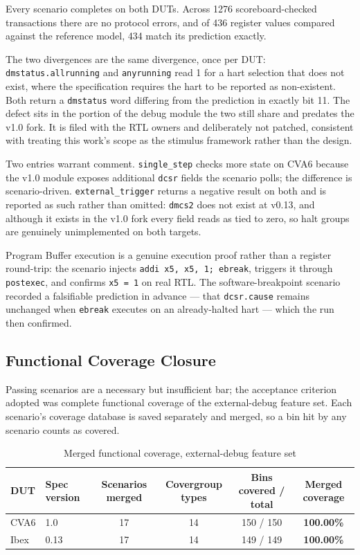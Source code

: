 \documentclass[conference]{IEEEtran}
\begin{document}
Every scenario completes on both DUTs. Across 1276 scoreboard-checked transactions there are no protocol errors, and of 436 register values compared against the reference model, 434 match its prediction exactly.

The two divergences are the same divergence, once per DUT: \texttt{dmstatus.allrunning} and \texttt{anyrunning} read 1 for a hart selection that does not exist, where the specification requires the hart to be reported as non-existent. Both return a \texttt{dmstatus} word differing from the prediction in exactly bit 11. The defect sits in the portion of the debug module the two still share and predates the v1.0 fork. It is filed with the RTL owners and deliberately not patched, consistent with treating this work's scope as the stimulus framework rather than the design.

Two entries warrant comment. \texttt{single\_step} checks more state on CVA6 because the v1.0 module exposes additional \texttt{dcsr} fields the scenario polls; the difference is scenario-driven. \texttt{external\_trigger} returns a negative result on both and is reported as such rather than omitted: \texttt{dmcs2} does not exist at v0.13, and although it exists in the v1.0 fork every field reads as tied to zero, so halt groups are genuinely unimplemented on both targets.

Program Buffer execution is a genuine execution proof rather than a register round-trip: the scenario injects \texttt{addi x5, x5, 1; ebreak}, triggers it through \texttt{postexec}, and confirms \texttt{x5 = 1} on real RTL. The software-breakpoint scenario recorded a falsifiable prediction in advance --- that \texttt{dcsr.cause} remains unchanged when \texttt{ebreak} executes on an already-halted hart --- which the run then confirmed.

\subsection{Functional Coverage Closure}
Passing scenarios are a necessary but insufficient bar; the acceptance criterion adopted was complete functional coverage of the external-debug feature set. Each scenario's coverage database is saved separately and merged, so a bin hit by any scenario counts as covered.

\begin{table}[!t]
\caption{Merged functional coverage, external-debug feature set}
\label{tab:III}
\centering
\footnotesize
\begin{tabular}{llcccc}
\toprule
DUT & Spec version & Scenarios merged & Covergroup types & Bins covered / total & Merged coverage \\
\midrule
CVA6 & 1.0 & 17 & 14 & 150 / 150 & \textbf{100.00\%} \\
Ibex & 0.13 & 17 & 14 & 149 / 149 & \textbf{100.00\%} \\
\bottomrule
\end{tabular}
\end{table}
\end{document}
